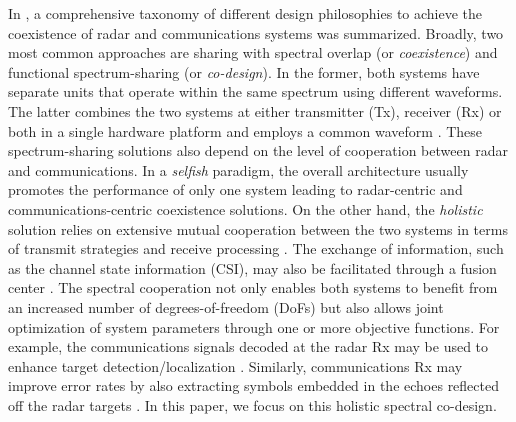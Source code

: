 \documentclass[9pt,journal]{IEEEtran}
\theoremstyle{definition}
\begin{document}
In \cite{d2020uplink}, a comprehensive taxonomy of different design philosophies to achieve the coexistence of radar and communications systems was summarized. Broadly, two most common approaches are sharing with spectral overlap (or \textit{coexistence}) and functional spectrum-sharing (or \textit{co-design}). In the former, both systems have separate units that operate within the same spectrum using different waveforms. %
The latter combines the two systems at either transmitter (Tx), receiver (Rx) or both in a single hardware platform and employs a common waveform %
\cite{mishra2019toward,liu2018mu,duggal2020doppler}%
. %
These spectrum-sharing solutions also depend on the level of cooperation between radar and communications. In a \textit{selfish} paradigm, the overall architecture usually promotes the performance of only one system leading to radar-centric \cite{alaee2019discrete,bao2019precoding,slavik2019cognitive} and communications-centric \cite{ayyar2019robust} coexistence solutions. %
On the other hand, the \textit{holistic} solution relies on extensive mutual cooperation between the two systems in terms of transmit strategies and receive processing \cite{mahal2017spectral,MCMIMO_RadComm,qian2018joint,rihan2018optimum,Lops2019serveillance,biswas2018fdqos,he2019performance}. The exchange of information, such as the channel state information (CSI), may also be facilitated through a fusion center \cite{MCMIMO_RadComm,he2019performance}.
The spectral cooperation not only enables both systems to benefit from an increased number of degrees-of-freedom (DoFs) but also allows joint optimization of system parameters through one \cite{MCMIMO_RadComm,qian2018joint} or more \cite{biswas2018fdqos,dokhanchi2020multi} objective functions. For example, the communications signals decoded at the radar Rx may be used to enhance target detection/localization \cite{biswas2018fdqos,he2019performance}. Similarly, communications Rx may improve error rates by also extracting symbols embedded in the echoes reflected off the radar targets \cite{liu2018mimo}. In this paper, we focus on this holistic spectral co-design.
\end{document}
